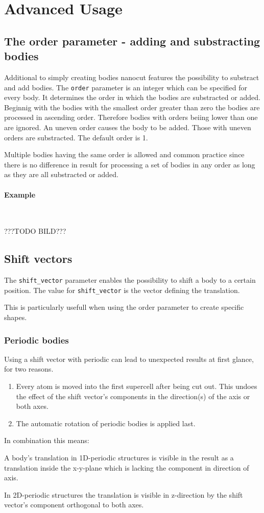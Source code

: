 \section{Advanced Usage}
\subsection{The order parameter - adding and substracting bodies}
Additional to simply creating bodies nanocut features the possibility to substract and add bodies.
The \lstinline{order} parameter is an integer which can be specified for every body. It determines the order in which the bodies are substracted or added. Beginnig with the bodies with the smallest order greater than zero the bodies are processed in ascending order. Therefore bodies with orders beiing lower than one are ignored.
An uneven order causes the body to be added. Those with uneven orders are substracted. The default order is 1.

Multiple bodies having the same order is allowed and common practice since there is no difference in result for processing a set of bodies in any order as long as they are all substracted or added.

\paragraph{Example}\ 

???TODO BILD???

\subsection{Shift vectors}
The \lstinline{shift_vector} parameter enables the possibility to shift a body to a certain position. The value for \lstinline{shift_vector} is the vector defining the translation.

This is particularly usefull when using the order parameter to create specific shapes.

\subsubsection{Periodic bodies}

Using a shift vector with periodic can lead to unexpected results at first glance, for two reasons. 
\begin{enumerate}
 \item Every atom is moved into the first supercell after being cut out. This undoes the effect of the shift vector's components in the direction(s) of the axis or both axes.
 \item The automatic rotation of periodic bodies is applied last.
\end{enumerate}
In combination this means: 

A body's translation in 1D-periodic structures is visible in the result as a translation inside the x-y-plane which is lacking the component in direction of axis.

In 2D-periodic structures the translation is visible in z-direction by the shift vector's component orthogonal to both axes.

